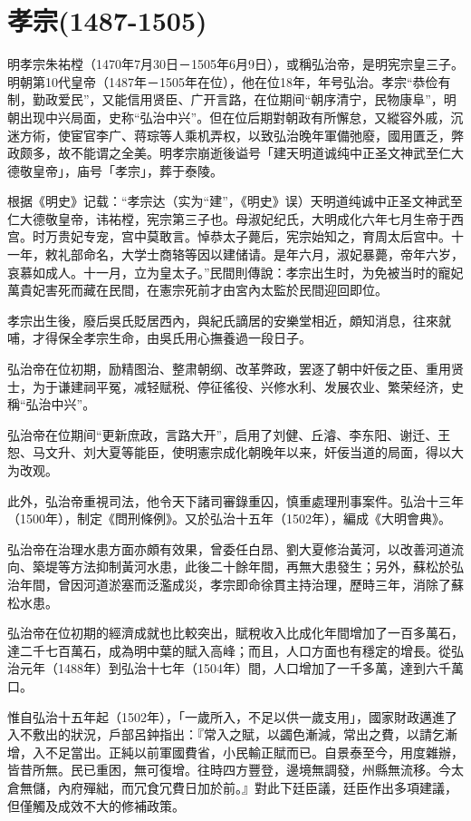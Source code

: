 
\section{孝宗\tiny(1487-1505)}

明孝宗朱祐樘（1470年7月30日－1505年6月9日），或稱弘治帝，是明宪宗皇三子。明朝第10代皇帝（1487年－1505年在位），他在位18年，年号弘治。孝宗“恭俭有制，勤政爱民”，又能信用贤臣、广开言路，在位期间“朝序清宁，民物康阜”，明朝出现中兴局面，史称“弘治中兴”。但在位后期對朝政有所懈怠，又縱容外戚，沉迷方術，使宦官李广、蒋琮等人乘机弄权，以致弘治晚年軍備弛廢，國用匱乏，弊政颇多，故不能谓之全美。明孝宗崩逝後谥号「建天明道诚纯中正圣文神武至仁大德敬皇帝」，庙号「孝宗」，葬于泰陵。

根据《明史》记载：“孝宗达（实为“建”，《明史》误）天明道纯诚中正圣文神武至仁大德敬皇帝，讳祐樘，宪宗第三子也。母淑妃纪氏，大明成化六年七月生帝于西宫。时万贵妃专宠，宫中莫敢言。悼恭太子薨后，宪宗始知之，育周太后宫中。十一年，敕礼部命名，大学士商辂等因以建储请。是年六月，淑妃暴薨，帝年六岁，哀慕如成人。十一月，立为皇太子。”民間則傳說：孝宗出生时，为免被当时的寵妃萬貴妃害死而藏在民間，在憲宗死前才由宮內太監於民間迎回即位。

孝宗出生後，廢后吳氏貶居西內，與紀氏謫居的安樂堂相近，頗知消息，往來就哺，才得保全孝宗生命，由吳氏用心撫養過一段日子。

弘治帝在位初期，励精图治、整肃朝纲、改革弊政，罢逐了朝中奸佞之臣、重用贤士，为于谦建祠平冤，减轻赋税、停征徭役、兴修水利、发展农业、繁荣经济，史稱“弘治中兴”。

弘治帝在位期间“更新庶政，言路大开”，启用了刘健、丘濬、李东阳、谢迁、王恕、马文升、刘大夏等能臣，使明憲宗成化朝晚年以来，奸佞当道的局面，得以大为改观。

此外，弘治帝重視司法，他令天下諸司審錄重囚，慎重處理刑事案件。弘治十三年（1500年），制定《問刑條例》。又於弘治十五年（1502年），編成《大明會典》。

弘治帝在治理水患方面亦頗有效果，曾委任白昂、劉大夏修治黃河，以改善河道流向、築堤等方法抑制黃河水患，此後二十餘年間，再無大患發生；另外，蘇松於弘治年間，曾因河道淤塞而泛濫成災，孝宗即命徐貫主持治理，歷時三年，消除了蘇松水患。

弘治帝在位初期的經濟成就也比較突出，賦稅收入比成化年間增加了一百多萬石，達二千七百萬石，成為明中葉的賦入高峰；而且，人口方面也有穩定的增長。從弘治元年（1488年）到弘治十七年（1504年）間，人口增加了一千多萬，達到六千萬口。

惟自弘治十五年起（1502年），「一歲所入，不足以供一歲支用」，國家財政邁進了入不敷出的狀況，戶部呂鈡指出：『常入之賦，以蠲色漸減，常出之費，以請乞漸增，入不足當出。正純以前軍國費省，小民輸正賦而已。自景泰至今，用度雜辦，皆昔所無。民已重困，無可復增。往時四方豐登，邊境無調發，州縣無流移。今太倉無儲，內府殫絀，而冗食冗費日加於前。』對此下廷臣議，廷臣作出多項建議，但僅觸及成效不大的修補政策。

